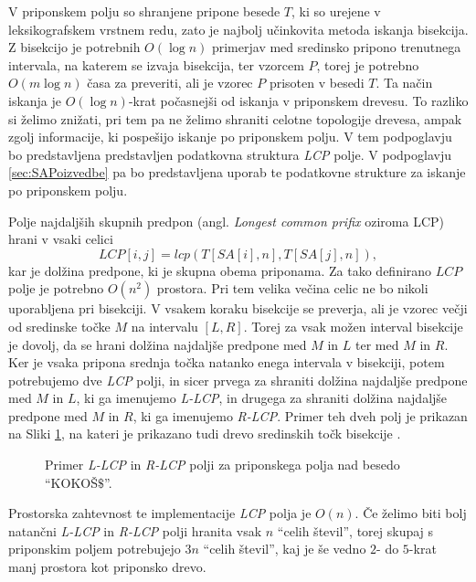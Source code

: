 V priponskem polju so shranjene pripone besede $T$, ki so urejene v leksikografskem vrstnem redu, zato je najbolj učinkovita metoda iskanja bisekcija. Z bisekcijo je potrebnih $O(\log{n})$ primerjav med sredinsko pripono trenutnega intervala, na katerem se izvaja bisekcija, ter vzorcem $P$, torej je potrebno $O(m\log{n})$ časa za preveriti, ali je vzorec $P$ prisoten v besedi $T$. Ta način iskanja je $O(\log{n})$-krat počasnejši od iskanja v priponskem drevesu. To razliko si želimo znižati, pri tem pa ne želimo shraniti celotne topologije drevesa, ampak zgolj informacije, ki pospešijo iskanje po priponskem polju. V tem podpoglavju bo predstavljena predstavljen podatkovna struktura \textit{LCP} polje. V podpoglavju \ref{sec:SAPoizvedbe} pa bo predstavljena uporab te podatkovne strukture za iskanje po priponskem polju.

Polje najdaljših skupnih predpon (angl. \textit{Longest common prifix} oziroma LCP) hrani v vsaki celici 
    $$\textit{LCP}[i,j]=lcp(T[SA[i],n],T[SA[j],n]),$$
kar je dolžina predpone, ki je skupna obema priponama. Za tako definirano $LCP$ polje je potrebno $O(n^2)$ prostora. Pri tem velika večina celic ne bo nikoli uporabljena pri bisekciji. V vsakem koraku bisekcije se preverja, ali je vzorec večji od sredinske točke $M$ na intervalu $[L,R]$. Torej za vsak možen interval bisekcije je dovolj, da se hrani dolžina najdaljše predpone med $M$ in $L$ ter med $M$ in $R$. Ker je vsaka pripona srednja točka natanko enega intervala v bisekciji, potem potrebujemo dve \textit{LCP} polji, in sicer prvega za shraniti dolžina najdaljše predpone med $M$ in $L$, ki ga imenujemo \textit{L-LCP}, in drugega za shraniti dolžina najdaljše predpone med $M$ in $R$, ki ga imenujemo \textit{R-LCP}. Primer teh dveh polj je prikazan na Sliki \ref{fig:RlcpLlcpSuffuxArray}, na kateri je prikazano tudi drevo sredinskih točk bisekcije \cite{Manber1990}. 

\begin{figure}[htb] 
    
    \centering
    \caption{Primer \textit{L-LCP} in \textit{R-LCP} polji za priponskega polja nad besedo \enquote{KOKOŠ$\$$}.} 
    \label{fig:RlcpLlcpSuffuxArray}
\end{figure}

Prostorska zahtevnost te implementacije \textit{LCP} polja je $O(n)$. Če želimo biti bolj natančni \textit{L-LCP} in \textit{R-LCP} polji hranita vsak $n$ \enquote{celih števil}, torej skupaj s priponskim poljem potrebujejo $3n$ \enquote{celih števil}, kaj je še vedno $2$- do $5$-krat manj prostora kot priponsko drevo.

